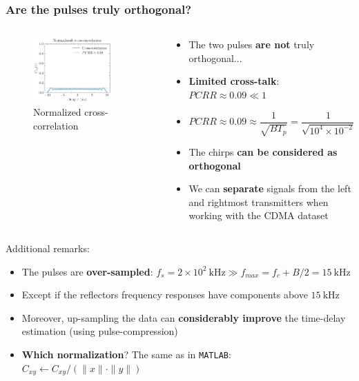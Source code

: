 \documentclass[UKenglish,8pt,aspectratio=1610]{beamer}
\begin{document}
\begin{frame}
	\frametitle{Are the pulses truly orthogonal?}
\begin{columns}
	\begin{column}{0.5\textwidth}
		\begin{figure}[h!]
			\includegraphics[width=0.8\textwidth]{question1/cross_corr_plot}
			\centering
			\caption{Normalized cross-correlation}
		\end{figure}
	\end{column}
	\begin{column}{0.5\textwidth}
	\begin{itemize}
		\item The two pulses \textbf{are not} truly orthogonal...
		\item \textbf{Limited cross-talk}: $PCRR\approx 0.09\ll1$
		\item $PCRR\approx 0.09\approx\dfrac{1}{\sqrt{BT_p}}=\dfrac{1}{\sqrt{10^4\times 10^{-2}}} = 0.1$
		\item The chirps \textbf{can be considered as orthogonal}
		\item We can \textbf{separate} signals from the left and rightmost transmitters when working with the CDMA dataset
	\end{itemize}
	\end{column}
\end{columns}
Additional remarks:
\begin{itemize}
	\item The pulses are \textbf{over-sampled}: $f_s=2\times 10^{2}~\si{\kilo\hertz}\gg f_{max} = f_c + B/2 = 15~\si{\kilo\hertz}$
	\item Except if the reflectors frequency responses have components above $15~\si{\kilo\hertz}$
	\item Moreover, up-sampling the data can \textbf{considerably improve} the time-delay estimation (using pulse-compression)
	\item \textbf{Which normalization}? The same as in \texttt{MATLAB}: $C_{xy}\leftarrow C_{xy} / (\rVert x\lVert\cdot\rVert y\lVert)$
\end{itemize}
\end{frame}
\end{document}
